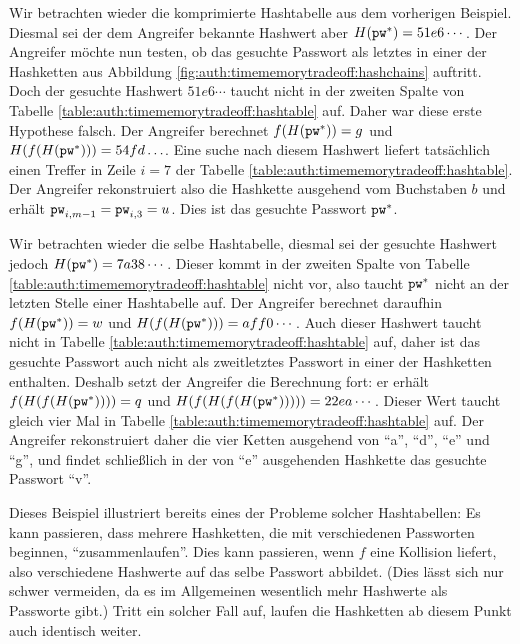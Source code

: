 \begin{beispiel} Wir betrachten wieder die komprimierte Hashtabelle aus
dem vorherigen Beispiel. Diesmal sei der dem Angreifer bekannte Hashwert
aber $H(\texttt{pw}^*) = 51e6\cdots$.  Der Angreifer möchte nun testen, ob das
gesuchte Passwort als letztes in einer der Hashketten aus Abbildung
\ref{fig:auth:timememorytradeoff:hashchains} auftritt.  Doch der
gesuchte Hashwert $51e6\cdots$ taucht nicht in der zweiten Spalte von
Tabelle \ref{table:auth:timememorytradeoff:hashtable} auf.  Daher war
diese erste Hypothese falsch. Der Angreifer berechnet $f(H(\texttt{pw}^*)) = g$
und $H(f(H(\texttt{pw}^*))) = 54fd\ldots$.  Eine suche nach diesem Hashwert
liefert tatsächlich einen Treffer in Zeile $i = 7$ der Tabelle
\ref{table:auth:timememorytradeoff:hashtable}.  Der Angreifer
rekonstruiert also die Hashkette ausgehend vom Buchstaben $b$ und erhält
$\texttt{pw}_{i,m-1} = \texttt{pw}_{i,3} = u$.  Dies ist das gesuchte Passwort
$\texttt{pw}^*$.
\end{beispiel}

\begin{beispiel} Wir betrachten wieder die selbe Hashtabelle, diesmal
sei der gesuchte Hashwert jedoch $H(\texttt{pw}^*) = 7a38\cdots$.  Dieser kommt
in der zweiten Spalte von Tabelle
\ref{table:auth:timememorytradeoff:hashtable} nicht vor, also taucht
$\texttt{pw}^*$ nicht an der letzten Stelle einer Hashtabelle auf.  Der
Angreifer berechnet daraufhin $f(H(\texttt{pw}^*)) = w$ und $H(f(H(\texttt{pw}^*))) =
aff0\cdots$. Auch dieser Hashwert taucht nicht in Tabelle
\ref{table:auth:timememorytradeoff:hashtable} auf, daher ist das
gesuchte Passwort auch nicht als zweitletztes Passwort in einer der
Hashketten enthalten.  Deshalb setzt der Angreifer die Berechnung fort:
er erhält $f(H(f(H(\texttt{pw}^*)))) = q$ und $H(f(H(f(H(\texttt{pw}^*))))) =
22ea\cdots$. Dieser Wert taucht gleich vier Mal in Tabelle
\ref{table:auth:timememorytradeoff:hashtable} auf. Der Angreifer
rekonstruiert daher die vier Ketten ausgehend von "`a"', "`d"', "`e"'
und "`g"', und findet schließlich in der von "`e"' ausgehenden Hashkette
das gesuchte Passwort "`v"'.
\end{beispiel}

Dieses Beispiel illustriert bereits eines der Probleme solcher
Hashtabellen: Es kann passieren, dass mehrere Hashketten, die mit
verschiedenen Passworten beginnen, "`zusammenlaufen"'.  Dies kann
passieren, wenn $f$ eine Kollision liefert, also verschiedene Hashwerte
auf das selbe Passwort abbildet. (Dies lässt sich nur schwer vermeiden,
da es im Allgemeinen wesentlich mehr Hashwerte als Passworte gibt.)
Tritt ein solcher Fall auf, laufen die Hashketten ab diesem Punkt auch
identisch weiter.

